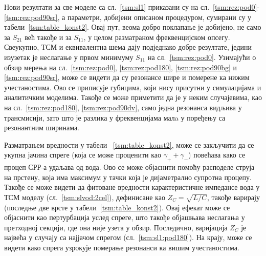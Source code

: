 Нови резултати за све моделе са сл.~\ref{tsm:sl1} приказани су на сл.~\ref{tsm:rez:pod0}-\ref{tsm:rez:pod90sr}, а параметри, добијени описаном процедуром, сумирани су у табели~\ref{tsm:table_konst2}. Овај пут, веома добро поклапање је добијено, не само за $S_{21}$ већ такође и за $S_{11}$, у целом разматраном фреквенцијском опсегу. Свеукупно, ТСМ и еквивалентна шема дају подједнако добре резултате, једини изузетак је неслагање у првом минимуму $S_{11}$ на сл.~\ref{tsm:rez:pod0}. Узимајући о обзир мерења на сл.~\ref{tsm:rez:pod0}, \ref{tsm:rez:pod180}, \ref{tsm:rez:pod90bg} и \ref{tsm:rez:pod90sr}, може се видети да су резонансе шире и померене ка нижим учестаностима. Ово се приписује губицима, који нису присутни у симулацијама и аналитичким моделима. Такође се може приметити да је у неким случајевима, као на сл.~\ref{tsm:rez:pod180}, \ref{tsm:rez:pod90dv}, само једна резонанса видљива у трансмисији, зато што је разлика у фреквенцијама малa у поређењу са резонантним ширинама.

Разматрањем вредности у табели ~\ref{tsm:table_konst2}, може се закључити да се укупна јачина спреге (која се може проценити као $\gamma_+ + \gamma_-$) повећава како се процеп СРР-а удаљава од вода. Ово се може објаснити помоћу расподеле струја на прстену, која има максимум у тачки која је дијаметрално супротна процепу. Такође се може видети да фитоване вредности карактеристичне импедансе вода у ТСМ моделу (сл.~\ref{tsm:slvod:2cel}), дефинисане као $Z_C = \sqrt{L/C}$, такође варирају (последње две врсте у табели~\ref{tsm:table_konst2}). Овај ефекат може се објаснити као пертурбација услед спреге, што такође објашњава неслагања у претходној секцији, где она није узета у обзир. Последично, варијација $Z_C$ је највећа у случају са најјачом спрегом (сл.~\ref{tsm:sl1:pod180}). На крају, може се видети како спрега узрокује померање резонанси ка вишим учестаностима.

